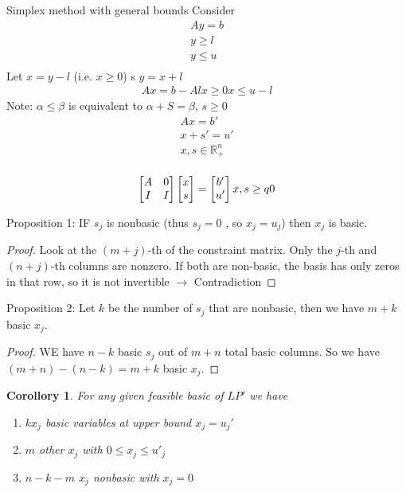 \documentclass{article}
\theoremstyle{plain}
\newtheorem{cor}{Corollory}
\theoremstyle{definition}
\begin{document}
Simplex method with general bounds
Consider
\begin{align*}
    Ay = b\\
    y \geq l\\
    y \leq u\\
\end{align*}
Let $x = y - l$ (i.e. $x\geq 0$) s $y = x + l$
\begin{align*}
    Ax = b - Al
    x \geq 0
    x \leq u-l
\end{align*}
Note: $\alpha \leq \beta$ is equivalent to $\alpha + S = \beta$, $s\geq 0$
\begin{align*}
    Ax = b'\\
    x + s' = u'\\
    x, s\in\mathbb{R}^n_+\\
\end{align*}

\[
    \begin{bmatrix}
        A & 0\\
        I & I\\
    \end{bmatrix}
    \begin{bmatrix}
        x\\
        s\\
    \end{bmatrix}
=
    \begin{bmatrix}
        b'\\
        u'\\
    \end{bmatrix}
    \\
    x, s \ge q0
\]

Proposition 1: IF $s_j$ is nonbasic (thus $s_j = 0$ , so $x_j = u_j$)
then $x_j$ is basic.
\begin{proof}
    Look at the $(m+j)$-th of the constraint matrix. Only the $j$-th and $(n+j)$-th
    columns are nonzero. If both are non-basic, the basis has only zeros in that
    row, so it is not invertible $\rightarrow$ Contradiction
\end{proof}

Proposition 2: Let $k$ be the number of $s_j$ that are nonbasic, then we have $m+k$ basic
$x_j$.
\begin{proof}
    WE have $n-k$ basic $s_j$ out of $m+n$ total basic columns. So we have $(m+n)-(n-k)=
    m+k$ basic $x_j$.
\end{proof}

\begin{cor}
    For any given feasible basic of $LP'$ we have
    \begin{enumerate}
        \item $k x_j$ basic variables at upper bound $x_j = u_j'$
        \item $m$ other $x_j$ with $0\leq x_j \leq u'_j$
        \item $n-k-m$ $x_j$ nonbasic with $x_j = 0$
    \end{enumerate}
\end{cor}
\end{document}

